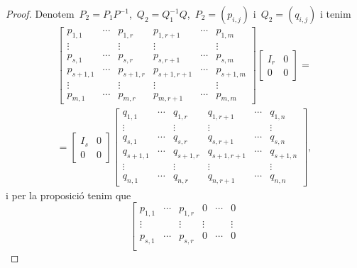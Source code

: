 \documentclass[../algebra-lineal.tex]{subfiles}
\begin{document}
\begin{proof}
        Denotem~\(P_{2}=P_{1}P^{-1}\),~\(Q_{2}=Q_{1}^{-1}Q\),~\(P_{2}=(p_{i,j})\) i~\(Q_{2}=(q_{i,j})\) i tenim
        \begin{multline*}
        \left[\begin{array}{ccc|ccc}
        p_{1,1} & \cdots & p_{1,r} & p_{1,r+1} & \cdots & p_{1,m} \\
        \vdots & & \vdots & \vdots & & \vdots \\
        p_{s,1} & \cdots & p_{s,r} & p_{s,r+1} & \cdots & p_{s,m} \\\hline
        p_{s+1,1} & \cdots & p_{s+1,r} & p_{s+1,r+1} & \cdots & p_{s+1,m} \\
        \vdots & & \vdots & \vdots & & \vdots \\
        p_{m,1} & \cdots & p_{m,r} & p_{m,r+1} & \cdots & p_{m,m}
        \end{array}\right]
        \left[\begin{array}{c|c}
        I_{r} & 0\\\hline
        0 & 0
        \end{array}\right]=\\=
        \left[\begin{array}{c|c}
        I_{s} & 0\\\hline
        0 & 0
        \end{array}\right]
        \left[\begin{array}{ccc|ccc}
        q_{1,1} & \cdots & q_{1,r} & q_{1,r+1} & \cdots & q_{1,n} \\
        \vdots & & \vdots & \vdots & & \vdots \\
        q_{s,1} & \cdots & q_{s,r} & q_{s,r+1} & \cdots & q_{s,n} \\\hline
        q_{s+1,1} & \cdots & q_{s+1,r} & q_{s+1,r+1} & \cdots & q_{s+1,n} \\
        \vdots & & \vdots & \vdots & & \vdots \\
        q_{n,1} & \cdots & q_{n,r} & q_{n,r+1} & \cdots & q_{n,n}
        \end{array}\right],
        \end{multline*}
        i per la proposició  tenim que
        \[\left[\begin{array}{cccccc}
        p_{1,1} & \cdots & p_{1,r} & 0 & \cdots & 0 \\
        \vdots & & \vdots & \vdots & & \vdots \\
        p_{s,1} & \cdots & p_{s,r} & 0 & \cdots & 0 \\

\end{array}\]
\end{proof}
\end{document}
